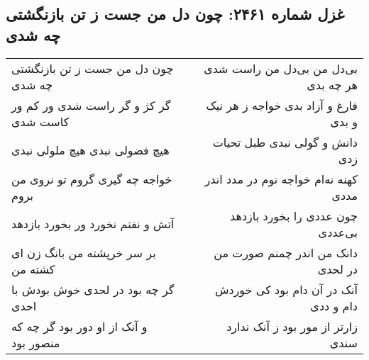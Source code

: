 \begin{center}
\section*{غزل شماره ۲۴۶۱: چون دل من جست ز تن بازنگشتی چه شدی}
\label{sec:2461}
\begin{longtable}{l p{0.5cm} r}
چون دل من جست ز تن بازنگشتی چه شدی
&&
بی‌دل من بی‌دل من راست شدی هر چه بدی
\\
گر کژ و گر راست شدی ور کم ور کاست شدی
&&
فارغ و آزاد بدی خواجه ز هر نیک و بدی
\\
هیچ فضولی نبدی هیچ ملولی نبدی
&&
دانش و گولی نبدی طبل تحیات زدی
\\
خواجه چه گیری گروم تو نروی من بروم
&&
کهنه نه‌ام خواجه نوم در مدد اندر مددی
\\
آتش و نفتم نخورد ور بخورد بازدهد
&&
چون عددی را بخورد بازدهد بی‌عددی
\\
بر سر خرپشته من بانگ زن ای کشته من
&&
دانک من اندر چمنم صورت من در لحدی
\\
گر چه بود در لحدی خوش بودش با احدی
&&
آنک در آن دام بود کی خوردش دام و ددی
\\
و آنک از او دور بود گر چه که منصور بود
&&
زارتر از مور بود ز آنک ندارد سندی
\\
\end{longtable}
\end{center}

